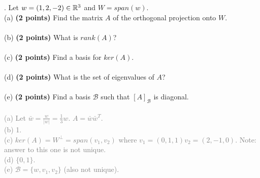 \documentclass[12pt,a4paper]{article}
\newcommand{\gray}[1]{\textcolor{gray}{#1}}
\renewcommand{\l}{\left}
\renewcommand{\r}{\right}
\def\R{\ifmmode\mathbb R\fi}
\begin{document}

\newpage
{}. Let $w = (1, 2, -2) \in \R^3$ and $W = span(w)$. \\
(a) \textbf{(2 points) }Find the matrix $A$ of the orthogonal projection onto $W$. \\
\\
(b) \textbf{(2 points) }What is $rank(A)$? \\
\\
(c) \textbf{(2 points) }Find a basis for $ker(A)$. \\
\\
(d) \textbf{(2 points) }What is the set of eigenvalues of $A$? \\
\\
(e) \textbf{(2 points) }Find a basis $\mathcal B$ such that $[A]_{\mathcal B}$ is diagonal. \\
\\
\gray{
    (a) Let $\bar w = \frac{w}{|w|} = \frac13 w$. $A = \bar w\bar w^T$. \\
    (b) 1. \\
    (c) $ker(A) = W^\perp = span(v_1, v_2)$ where $v_1 = (0, 1, 1) v_2 = (2, -1, 0)$. Note: answer to this one is not unique. \\
    (d) $\{0, 1\}$. \\
    (e) $\mathcal B = \{w, v_1, v_2\}$ (also not unique).
}
\end{document}
